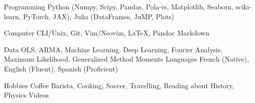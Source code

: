 

\begin{cvskills}

	\cvskill
	{Programming} %
	{Python (Numpy, Scipy, Pandas, Pola-rs, Matplotlib, Seaborn, sciki-learn, PyTorch, JAX), Julia (DataFrames, JuMP, Plots)}  %

	\cvskill
	{Computer}
	{CLI/Unix, Git, Vim/Neovim, \LaTeX, Pandoc Markdown}

	\cvskill
	{Data}
	{OLS, ARMA, Machine Learning, Deep Learning, Fourier Analysis, Maximum Likelihood, Generalized Method Moments}
	\cvskill
	{Languages} %
	{French (Native), English (Fluent), Spanish (Proficient)} %

	\cvskill
	{Hobbies}
	{Coffee Barista, Cooking, Soccer, Travelling, Reading about History, Physics Videos}
\end{cvskills}
